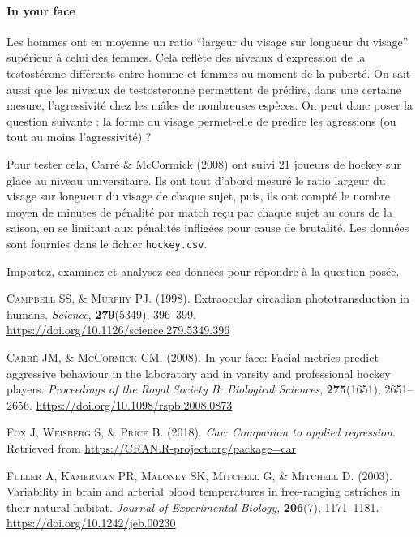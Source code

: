 \documentclass[a4paperpaper,]{article}
\let\oldparagraph\paragraph
\renewcommand{\paragraph}[1]{\oldparagraph{#1}\mbox{}}
\begin{document}
\hypertarget{in-your-face}{%
\paragraph{In your face}\label{in-your-face}}

Les hommes ont en moyenne un ratio ``largeur du visage sur longueur du visage'' supérieur à celui des femmes. Cela reflète des niveaux d'expression de la testostérone différents entre homme et femmes au moment de la puberté. On sait aussi que les niveaux de testosteronne permettent de prédire, dans une certaine mesure, l'agressivité chez les mâles de nombreuses espèces. On peut donc poser la question suivante : la forme du visage permet-elle de prédire les agressions (ou tout au moins l'agressivité) ?

Pour tester cela, Carré \& McCormick (\protect\hyperlink{ref-carre2008}{2008}) ont suivi 21 joueurs de hockey sur glace au niveau universitaire. Ils ont tout d'abord mesuré le ratio largeur du visage sur longueur du visage de chaque sujet, puis, ils ont compté le nombre moyen de minutes de pénalité par match reçu par chaque sujet au cours de la saison, en se limitant aux pénalités infligées pour cause de brutalité. Les données sont fournies dans le fichier \texttt{hockey.csv}.

Importez, examinez et analysez ces données pour répondre à la question posée.

\hypertarget{refs}{}
\leavevmode\hypertarget{ref-Campbell1998}{}%
\textsc{Campbell SS, \& Murphy PJ}. (1998). Extraocular circadian phototransduction in humans. \emph{Science}, \textbf{279}(5349), 396--399. \url{https://doi.org/10.1126/science.279.5349.396}

\leavevmode\hypertarget{ref-carre2008}{}%
\textsc{Carré JM, \& McCormick CM}. (2008). In your face: Facial metrics predict aggressive behaviour in the laboratory and in varsity and professional hockey players. \emph{Proceedings of the Royal Society B: Biological Sciences}, \textbf{275}(1651), 2651--2656. \url{https://doi.org/10.1098/rspb.2008.0873}

\leavevmode\hypertarget{ref-R-car}{}%
\textsc{Fox J, Weisberg S, \& Price B}. (2018). \emph{Car: Companion to applied regression}. Retrieved from \url{https://CRAN.R-project.org/package=car}

\leavevmode\hypertarget{ref-Fuller2003}{}%
\textsc{Fuller A, Kamerman PR, Maloney SK, Mitchell G, \& Mitchell D}. (2003). Variability in brain and arterial blood temperatures in free-ranging ostriches in their natural habitat. \emph{Journal of Experimental Biology}, \textbf{206}(7), 1171--1181. \url{https://doi.org/10.1242/jeb.00230}
\end{document}
